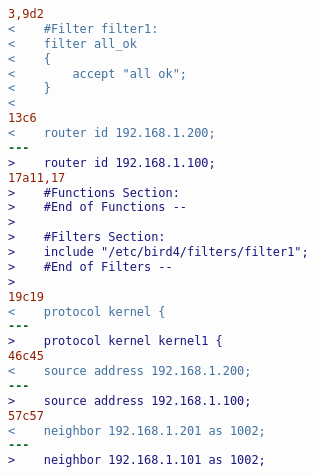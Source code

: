 \begin{lstlisting}[language=diff,caption={Battlemesh experiment code}]
3,9d2
<    #Filter filter1:
<    filter all_ok
<    {
<        accept "all ok";
<    }
<
13c6
<    router id 192.168.1.200;
---
>    router id 192.168.1.100;
17a11,17
>    #Functions Section:
>    #End of Functions --
>  
>    #Filters Section:
>    include "/etc/bird4/filters/filter1";
>    #End of Filters --
>  
19c19
<    protocol kernel {
---
>    protocol kernel kernel1 {
46c45
<    source address 192.168.1.200;
---
>    source address 192.168.1.100;
57c57
<    neighbor 192.168.1.201 as 1002;
---
>    neighbor 192.168.1.101 as 1002;
\end{lstlisting}